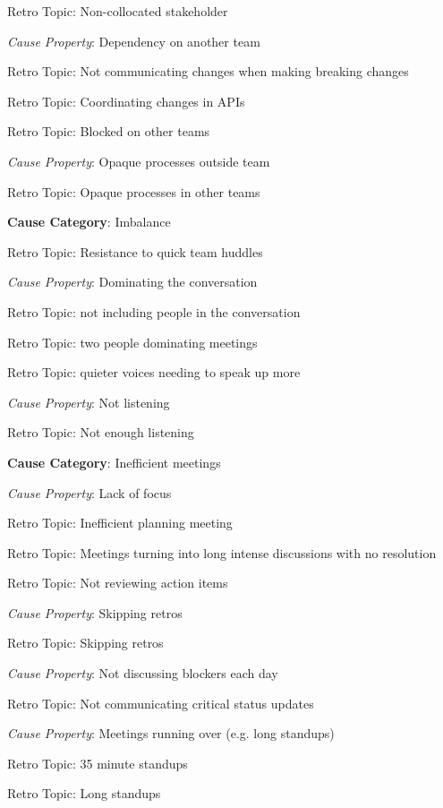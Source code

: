 \quad \quad \quad Retro Topic: Non-collocated stakeholder

\quad \quad \textit{Cause Property}: Dependency on another team

\quad \quad \quad Retro Topic: Not communicating changes when making breaking changes

\quad \quad \quad Retro Topic: Coordinating changes in APIs

\quad \quad \quad Retro Topic: Blocked on other teams

\quad \quad \textit{Cause Property}: Opaque processes outside team

\quad \quad \quad Retro Topic: Opaque processes in other teams

\quad \textbf{Cause Category}: Imbalance

\quad \quad Retro Topic: Resistance to quick team huddles

\quad \quad \textit{Cause Property}: Dominating the conversation

\quad \quad \quad Retro Topic: not including people in the conversation

\quad \quad \quad Retro Topic: two people dominating meetings

\quad \quad \quad Retro Topic: quieter voices needing to speak up more

\quad \quad \textit{Cause Property}: Not listening

\quad \quad \quad Retro Topic: Not enough listening

\quad \textbf{Cause Category}: Inefficient meetings

\quad \quad \textit{Cause Property}: Lack of focus

\quad \quad \quad Retro Topic: Inefficient planning meeting

\quad \quad \quad Retro Topic: Meetings turning into long intense discussions with no resolution

\quad \quad \quad Retro Topic: Not reviewing action items

\quad \quad \textit{Cause Property}: Skipping retros

\quad \quad \quad Retro Topic: Skipping retros

\quad \quad \textit{Cause Property}: Not discussing blockers each day

\quad \quad \quad Retro Topic: Not communicating critical status updates

\quad \quad \textit{Cause Property}: Meetings running over (e.g. long standups)

\quad \quad \quad Retro Topic: 35 minute standups

\quad \quad \quad Retro Topic: Long standups








